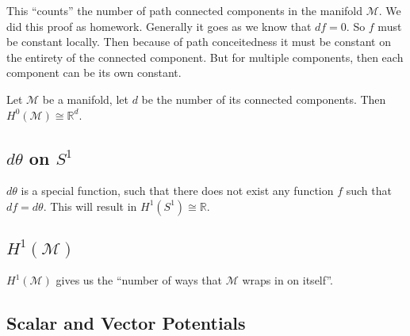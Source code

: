 \documentclass[10pt]{amsart}
\newcommand{\M}{\mathcal{M}}
\newcommand{\R}{\mathbb{R}}
\renewcommand{\*}{\star}
\begin{document}
This ``counts'' the number of path connected components in the manifold $\M$.
We did this proof as homework. Generally it goes as we know that $df=0$. So $f$
must be constant locally. Then because of path conceitedness it must be
constant on the entirety of the connected component. But for multiple
components, then each component can be its own constant.

Let $\M$ be a manifold, let $d$ be the number of its connected components.
Then $H^0(\M)\cong \R^d$.

\subsection{$d\theta$ on $S^1$}%
\label{sub:_dtheta_on_s_1_}

$d\theta$ is a special function, such that there does not exist any function
$f$ such that $df=d\theta$. This will result in $H^1(S^1)\cong\R$.

\subsection{$H^1(\M)$}%
\label{sub:_h_1_m_}

$H^1(\M)$ gives us the ``number of ways that $\M$ wraps in on itself''.

\subsection{Scalar and Vector Potentials}%
\label{sub:scalar_and_vector_potentials}
\end{document}
